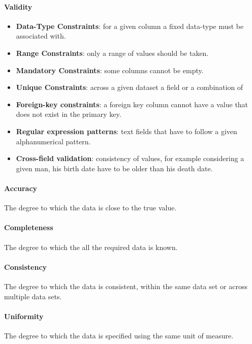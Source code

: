 \paragraph{Validity}
\begin{itemize}
    \item \textbf{Data-Type Constraints}: for a given column a fixed data-type must be associated with.
    \item \textbf{Range Constraints}: only a range of values should be taken.
    \item \textbf{Mandatory Constraints}: some columns cannot be empty.
    \item \textbf{Unique Constraints}: across a given dataset a field or a combination of
    \item \textbf{Foreign-key constraints}: a foreign key column cannot have a value that
        does not exist in the primary key.
    \item \textbf{Regular expression patterns}: text fields that have to follow a given 
        alphanumerical pattern.
    \item \textbf{Cross-field validation}: consistency of values, for example considering
        a given man, his birth date have to be older than his death date.
\end{itemize}

\paragraph{Accuracy}
The degree to which the data is close to the true value.

\paragraph{Completeness}
The degree to which the all the required data is known.

\paragraph{Consistency}
The degree to which the data is consistent, within the same data set or across multiple 
data sets.

\paragraph{Uniformity}
The degree to which the data is specified using the same unit of measure.
